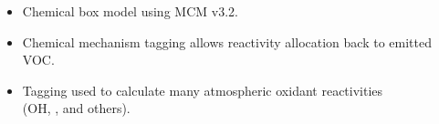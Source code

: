 \begin{BlueBox}
    \vskip-1cm
    \begin{block}{}
        \begin{itemize} 
            \item Chemical box model using MCM v3.2. \vspace{11mm}
            \item Chemical mechanism tagging \citep{Butler:2011} allows reactivity allocation back to emitted VOC. \vspace{11mm}
            \item Tagging used to calculate many atmospheric oxidant reactivities \\(OH, ,  and others).
        \end{itemize}
        \vskip1cm
        \begin{center}
            
        \end{center}
        \vskip1.6mm
    \end{block}
\end{BlueBox}
